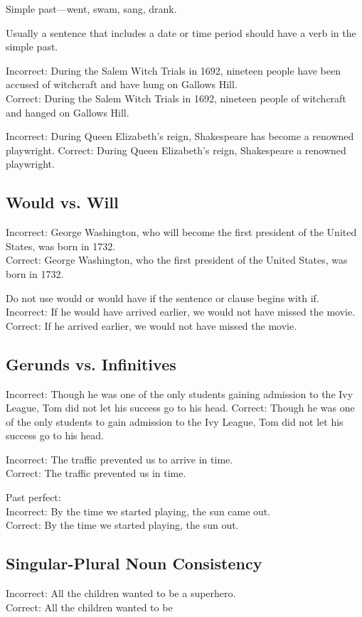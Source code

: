 \bigskip
Simple past—went, swam, sang, drank.

\bigskip
Usually a sentence that includes a date or time period should have a verb in the simple past.  

\bigskip
Incorrect:  During the Salem Witch Trials in 1692, nineteen people have been accused of witchcraft and have hung on Gallows Hill.\\
Correct:  During the Salem Witch Trials in 1692, nineteen people \longline of witchcraft and hanged on Gallows Hill.

\bigskip
Incorrect:  During Queen Elizabeth's reign, Shakespeare has become a renowned playwright.
Correct:  During Queen Elizabeth's reign, Shakespeare \longline a renowned playwright.

\subsection{Would vs. Will}
Incorrect:  George Washington, who will become the first president of the United States, was born in 1732.\\
Correct:  George Washington, who \longline the first president of the United States, was born in 1732.

\bigskip
Do not use would or would have if the sentence or clause begins with if.
Incorrect:  If he would have arrived earlier, we would not have missed the movie. \\
Correct:  If he \longline arrived earlier, we would not have missed the movie.

\subsection{Gerunds vs. Infinitives}
Incorrect: Though he was one of the only students gaining admission to the Ivy League, Tom did not let his success go to his head.
Correct:  Though he was one of the only students to gain admission to the Ivy League, Tom did not let his success go to his head.

\bigskip
Incorrect:  The traffic prevented us to arrive in time.\\
Correct:  The traffic prevented us \longline in time.

\bigskip
Past perfect: \\
Incorrect:  By the time we started playing, the sun came out.\\
Correct:  By the time we started playing, the sun \longline out.

\subsection{Singular-Plural Noun Consistency}
Incorrect:  All the children wanted to be a superhero. \\
Correct:  All the children wanted to be \hrulefill 

